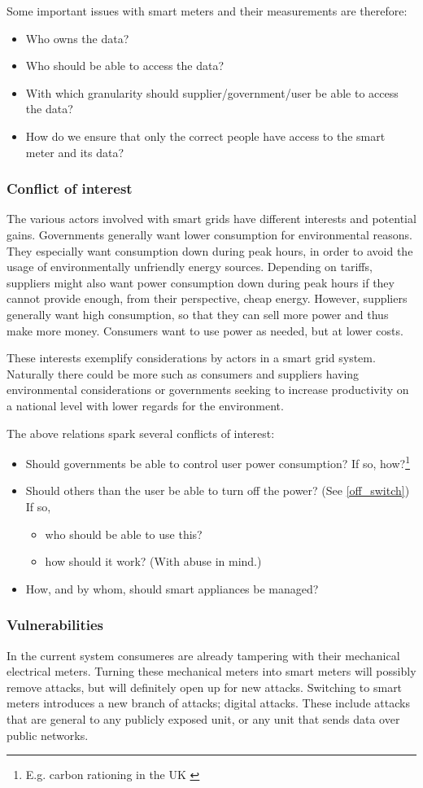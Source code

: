 Some important issues with smart meters and their measurements are therefore:
\begin{itemize}
	\item Who owns the data?
	\item Who should be able to access the data?
	\item With which granularity should supplier/government/user be able to access the data?
	\item How do we ensure that only the correct people have access to the smart meter and its data?
\end{itemize}

\subsubsection{Conflict of interest}
The various actors involved with smart grids have different interests and potential gains.
Governments generally want lower consumption for environmental reasons.
They especially want consumption down during peak hours, in order to avoid the usage of environmentally unfriendly energy sources.
Depending on tariffs, suppliers might also want power consumption down during peak hours if they cannot provide enough, from their perspective, cheap energy.
However, suppliers generally want high consumption, so that they can sell more power and thus make more money.
Consumers want to use power as needed, but at lower costs.

These interests exemplify considerations by actors in a smart grid system.
Naturally there could be more such as consumers and suppliers having environmental considerations or governments seeking to increase productivity on a national level with lower regards for the environment.

The above relations spark several conflicts of interest:
\begin{itemize}
	\item Should governments be able to control user power consumption? If so, how?\footnote{E.g. carbon rationing in the UK \cite{security_economics}}
	\item Should others than the user be able to turn off the power? (See \cref{off_switch}) If so,
	\begin{itemize}
		\item who should be able to use this?
		\item how should it work? (With abuse in mind.)
	\end{itemize}
	\item How, and by whom, should smart appliances be managed?
\end{itemize}

\subsubsection{Vulnerabilities}
In the current system consumeres are already tampering  with their mechanical electrical meters.
Turning these mechanical meters into smart meters will possibly remove attacks, but will definitely open up for new attacks.
Switching to smart meters introduces a new branch of attacks; digital attacks.
These include attacks that are general to any publicly exposed unit, or any unit that sends data over public networks.
